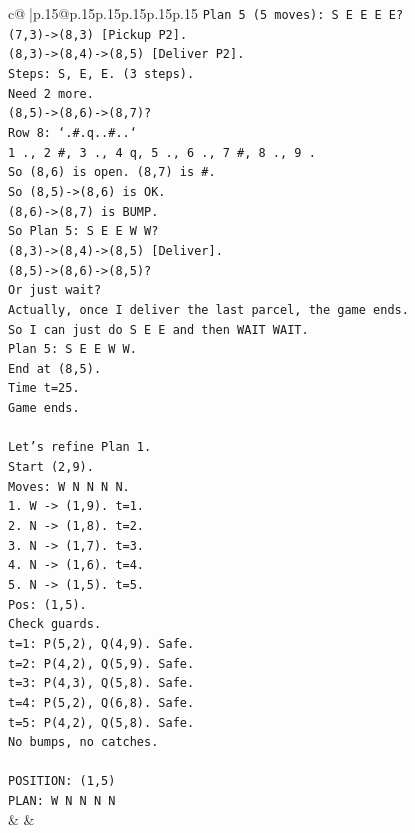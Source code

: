 \documentclass{article}
\begin{document}
{\begin{supertabular}{c@{$\;$}|p{.15\linewidth}@{}p{.15\linewidth}p{.15\linewidth}p{.15\linewidth}p{.15\linewidth}p{.15\linewidth}}
{{{\texttt{Plan 5 (5 moves): S E E E E?} \\
\texttt{(7,3){-}>(8,3) {[}Pickup P2{]}.} \\
\texttt{(8,3){-}>(8,4){-}>(8,5) {[}Deliver P2{]}.} \\
\texttt{Steps: S, E, E. (3 steps).} \\
\texttt{Need 2 more.} \\
\texttt{(8,5){-}>(8,6){-}>(8,7)?} \\
\texttt{Row 8: `.\#.q..\#..`} \\
\texttt{1 ., 2 \#, 3 ., 4 q, 5 ., 6 ., 7 \#, 8 ., 9 .} \\
\texttt{So (8,6) is open. (8,7) is \#.} \\
\texttt{So (8,5){-}>(8,6) is OK.} \\
\texttt{(8,6){-}>(8,7) is BUMP.} \\
\texttt{So Plan 5: S E E W W?} \\
\texttt{(8,3){-}>(8,4){-}>(8,5) {[}Deliver{]}.} \\
\texttt{(8,5){-}>(8,6){-}>(8,5)?} \\
\texttt{Or just wait?} \\
\texttt{Actually, once I deliver the last parcel, the game ends.} \\
\texttt{So I can just do S E E and then WAIT WAIT.} \\
\texttt{Plan 5: S E E W W.} \\
\texttt{End at (8,5).} \\
\texttt{Time t=25.} \\
\texttt{Game ends.} \\
\\ 
\texttt{Let's refine Plan 1.} \\
\texttt{Start (2,9).} \\
\texttt{Moves: W N N N N.} \\
\texttt{1. W {-}> (1,9). t=1.} \\
\texttt{2. N {-}> (1,8). t=2.} \\
\texttt{3. N {-}> (1,7). t=3.} \\
\texttt{4. N {-}> (1,6). t=4.} \\
\texttt{5. N {-}> (1,5). t=5.} \\
\texttt{Pos: (1,5).} \\
\texttt{Check guards.} \\
\texttt{t=1: P(5,2), Q(4,9). Safe.} \\
\texttt{t=2: P(4,2), Q(5,9). Safe.} \\
\texttt{t=3: P(4,3), Q(5,8). Safe.} \\
\texttt{t=4: P(5,2), Q(6,8). Safe.} \\
\texttt{t=5: P(4,2), Q(5,8). Safe.} \\
\texttt{No bumps, no catches.} \\
\\ 
\texttt{POSITION: (1,5)} \\
\texttt{PLAN: W N N N N} \\
            }
        }
    }
    & & \\ \\


\end{supertabular}}
\end{document}
